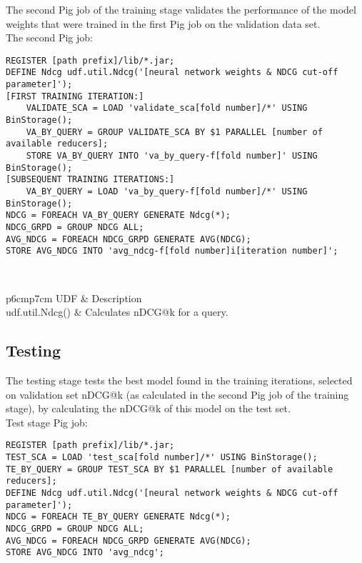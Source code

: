 The second Pig job of the training stage validates the performance of the model weights that were trained in the first Pig job on the validation data set.\\

The second Pig job:\\
\begin{minipage}{\linewidth}
\begin{lstlisting}
REGISTER [path prefix]/lib/*.jar;
DEFINE Ndcg udf.util.Ndcg('[neural network weights & NDCG cut-off parameter]');
[FIRST TRAINING ITERATION:]
	VALIDATE_SCA = LOAD 'validate_sca[fold number]/*' USING BinStorage();
	VA_BY_QUERY = GROUP VALIDATE_SCA BY $1 PARALLEL [number of available reducers];
	STORE VA_BY_QUERY INTO 'va_by_query-f[fold number]' USING BinStorage();
[SUBSEQUENT TRAINING ITERATIONS:]
	VA_BY_QUERY = LOAD 'va_by_query-f[fold number]/*' USING BinStorage();
NDCG = FOREACH VA_BY_QUERY GENERATE Ndcg(*);
NDCG_GRPD = GROUP NDCG ALL;
AVG_NDCG = FOREACH NDCG_GRPD GENERATE AVG(NDCG);
STORE AVG_NDCG INTO 'avg_ndcg-f[fold number]i[iteration number]';
\end{lstlisting}
\end{minipage}\\

\begin{table}
\centering
\begin{tabular}{p{6cm}p{7cm}}\toprule
UDF & Description \\
\midrule
udf.util.Ndcg() & Calculates \ac{nDCG}@k for a query.\\
\bottomrule
\end{tabular}
\caption{Description of training User Defined Functions (2/2)}
\label{tbl:training_udfs_2}
\end{table}

\subsection{Testing}
The testing stage tests the best model found in the training iterations, selected on validation set \ac{nDCG}@k (as calculated in the second Pig job of the training stage), by calculating the \ac{nDCG}@k of this model on the test set.\\

Test stage Pig job:\\
\begin{minipage}{\linewidth}
\begin{lstlisting}
REGISTER [path prefix]/lib/*.jar;
TEST_SCA = LOAD 'test_sca[fold number]/*' USING BinStorage();
TE_BY_QUERY = GROUP TEST_SCA BY $1 PARALLEL [number of available reducers];
DEFINE Ndcg udf.util.Ndcg('[neural network weights & NDCG cut-off parameter]');
NDCG = FOREACH TE_BY_QUERY GENERATE Ndcg(*);
NDCG_GRPD = GROUP NDCG ALL;
AVG_NDCG = FOREACH NDCG_GRPD GENERATE AVG(NDCG);
STORE AVG_NDCG INTO 'avg_ndcg';
\end{lstlisting}
\end{minipage}\\

